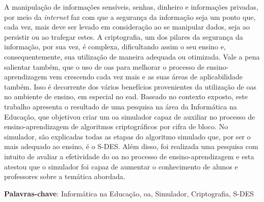 \documentclass[
	12pt,				%
	openany,			%
	oneside,			%
	a4paper,			%
	english,			%
	brazil				%
	]{{Modelo/abntex2_FBUNI}}
\begin{document}
\begin{resumo}
    A manipulação de informações sensíveis, senhas, dinheiro e informações privadas, por meio da \textit{internet} faz com que a segurança da informação seja um ponto que, cada vez, mais deve ser levado em consideração ao se manipular dados, seja ao persistir ou ao trafegar estes. A criptografia, um dos pilares da segurança da informação, por sua vez, é complexa, dificultando assim o seu ensino e, consequentemente, sua utilização de maneira adequada ou otimizada. Vale a pena salientar também, que o uso de \acrfull{oas} para melhorar o processo de ensino-aprendizagem vem crescendo cada vez mais e as suas áreas de aplicabilidade também. Isso é decorrente dos vários benefícios provenientes da utilização de \acrshort{oas} no ambiente de ensino, em especial no \acrfull{ead}. Baseado no contexto exposto, este trabalho apresenta o resultado de uma pesquisa na área da Informática na Educação, que objetivou criar um \acrlong{oa} simulador capaz de auxiliar no processo de ensino-aprendizagem de algoritmos criptográficos por cifra de bloco. No simulador, são explicadas todas as etapas do algoritmo simulado que, por ser o mais adequado ao ensino, é o S-DES. Além disso, foi realizada uma pesquisa com intuito de avaliar a efetividade do \acrshort{oa} no processo de ensino-aprendizagem e esta atestou que o simulador foi capaz de aumentar o conhecimento de alunos e professores sobre a temática abordada.
    
    \vspace{\onelineskip}
    \noindent 
    \textbf{Palavras-chave}:  Informática na Educação, \acrfull{oa}, Simulador, Criptografia, S-DES
\end{resumo}
\cleardoublepage
\end{document}
